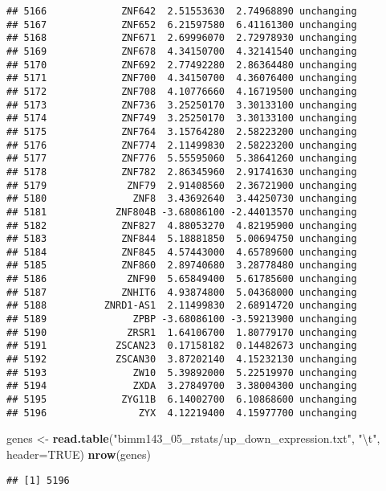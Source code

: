 \documentclass[]{article}
\newenvironment{Shaded}{\begin{snugshade}}{\end{snugshade}}
\newcommand{\KeywordTok}[1]{\textcolor[rgb]{0.13,0.29,0.53}{\textbf{#1}}}
\newcommand{\DataTypeTok}[1]{\textcolor[rgb]{0.13,0.29,0.53}{#1}}
\newcommand{\CharTok}[1]{\textcolor[rgb]{0.31,0.60,0.02}{#1}}
\newcommand{\StringTok}[1]{\textcolor[rgb]{0.31,0.60,0.02}{#1}}
\newcommand{\OtherTok}[1]{\textcolor[rgb]{0.56,0.35,0.01}{#1}}
\newcommand{\NormalTok}[1]{#1}
\begin{document}
\begin{verbatim}
## 5166             ZNF642  2.51553630  2.74968890 unchanging
## 5167             ZNF652  6.21597580  6.41161300 unchanging
## 5168             ZNF671  2.69996070  2.72978930 unchanging
## 5169             ZNF678  4.34150700  4.32141540 unchanging
## 5170             ZNF692  2.77492280  2.86364480 unchanging
## 5171             ZNF700  4.34150700  4.36076400 unchanging
## 5172             ZNF708  4.10776660  4.16719500 unchanging
## 5173             ZNF736  3.25250170  3.30133100 unchanging
## 5174             ZNF749  3.25250170  3.30133100 unchanging
## 5175             ZNF764  3.15764280  2.58223200 unchanging
## 5176             ZNF774  2.11499830  2.58223200 unchanging
## 5177             ZNF776  5.55595060  5.38641260 unchanging
## 5178             ZNF782  2.86345960  2.91741630 unchanging
## 5179              ZNF79  2.91408560  2.36721900 unchanging
## 5180               ZNF8  3.43692640  3.44250730 unchanging
## 5181            ZNF804B -3.68086100 -2.44013570 unchanging
## 5182             ZNF827  4.88053270  4.82195900 unchanging
## 5183             ZNF844  5.18881850  5.00694750 unchanging
## 5184             ZNF845  4.57443000  4.65789600 unchanging
## 5185             ZNF860  2.89740680  3.28778480 unchanging
## 5186              ZNF90  5.65849400  5.61785600 unchanging
## 5187             ZNHIT6  4.93874800  5.04368000 unchanging
## 5188          ZNRD1-AS1  2.11499830  2.68914720 unchanging
## 5189               ZPBP -3.68086100 -3.59213900 unchanging
## 5190              ZRSR1  1.64106700  1.80779170 unchanging
## 5191            ZSCAN23  0.17158182  0.14482673 unchanging
## 5192            ZSCAN30  3.87202140  4.15232130 unchanging
## 5193               ZW10  5.39892000  5.22519970 unchanging
## 5194               ZXDA  3.27849700  3.38004300 unchanging
## 5195             ZYG11B  6.14002700  6.10868600 unchanging
## 5196                ZYX  4.12219400  4.15977700 unchanging
\end{verbatim}

\begin{Shaded}
\begin{Highlighting}[]
\NormalTok{genes <-}\StringTok{ }\KeywordTok{read.table}\NormalTok{(}\StringTok{"bimm143_05_rstats/up_down_expression.txt"}\NormalTok{, }\StringTok{"}\CharTok{\textbackslash{}t}\StringTok{"}\NormalTok{, }\DataTypeTok{header=}\OtherTok{TRUE}\NormalTok{)}
\KeywordTok{nrow}\NormalTok{(genes)}
\end{Highlighting}
\end{Shaded}

\begin{verbatim}
## [1] 5196
\end{verbatim}
\end{document}
